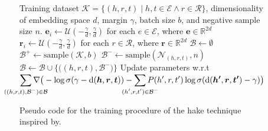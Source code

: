 \begin{figure*}
  \caption{Pseudo code for the training procedure of the \ac{hake} technique inspired by\cite{Bordes2013}.}\label{alg:learning}
  \begin{algorithmic}[1]
    \Require Training dataset $\mathcal{K} = \{(h, r, t) \mid h, t \in \mathcal{E} \wedge r \in \mathcal{R}\}$, dimensionality of embedding space $d$, margin $\gamma$, batch size $b$, and negative sample size $n$.
    \Statex
    \State $\bm{e}_i \gets \mathcal{U}(-\frac{\gamma}{d}, \frac{\gamma}{d})$ for each $e \in \mathcal{E}$, where $\bm{e} \in \mathbb{R}^{2d}$ \label{alg:learning:ent}
    \State $\bm{r}_i \gets \mathcal{U}(-\frac{\gamma}{d}, \frac{\gamma}{d})$ for each $r \in \mathcal{R}$, where $\bm{r} \in \mathbb{R}^{2d}$ \label{alg:learning:rel}
    \Loop
    \State $\mathcal{B} \gets \emptyset$
    \State $\mathcal{B}^+ \gets \text{sample}(\mathcal{K}, b)$ \label{alg:learning:pos-batch}
    \State $\mathcal{B}^- \gets \text{sample}(\mathcal{N}_{(h, r, t)}, n)$ \label{alg:learning:neg-batch}
    \State $\mathcal{B} \gets \mathcal{B} \cup \{\big((h, r, t), \mathcal{B}^-\big)\}$ \label{alg:learning:batch}
    \EndFor
    \State Update parameters w.r.t $\displaystyle\sum_{\mathclap{((h, r, t), \mathcal{B}^-) \in \mathcal{B}}} \nabla \big(- \log\sigma(\gamma - \text{d}(\bm{h}, \bm{r}, \bm{t})) - \sum_{\mathclap{(h', r, t') \in \mathcal{B}^-}} P(h', r, t') \log\sigma(\text{d}(\bm{h'}, \bm{r}, \bm{t'}) - \gamma)\big)$ \label{alg:learning:loss}

    \EndLoop
  \end{algorithmic}
\end{figure*}
